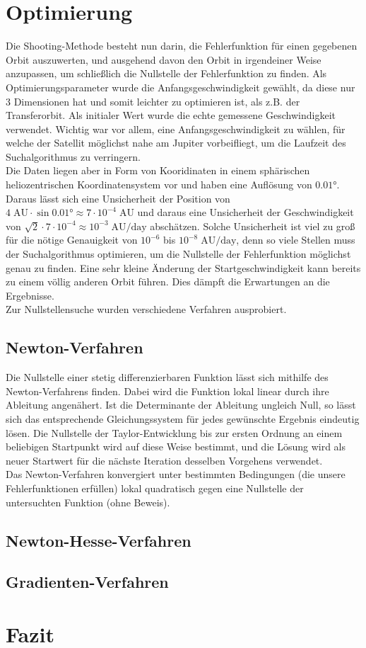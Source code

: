 \section{Optimierung}
Die Shooting-Methode besteht nun darin, die Fehlerfunktion für einen gegebenen Orbit auszuwerten, und ausgehend davon den Orbit in irgendeiner Weise anzupassen, um schließlich die Nullstelle der Fehlerfunktion zu finden.
Als Optimierungsparameter wurde die Anfangsgeschwindigkeit gewählt, da diese nur 3 Dimensionen hat und somit leichter zu optimieren ist, als z.B. der Transferorbit.
Als initialer Wert wurde die echte gemessene Geschwindigkeit verwendet. Wichtig war vor allem, eine Anfangsgeschwindigkeit zu wählen, für welche der Satellit möglichst nahe am Jupiter vorbeifliegt, um die Laufzeit des Suchalgorithmus zu verringern. \\
Die Daten liegen aber in Form von Kooridinaten in einem sphärischen heliozentrischen Koordinatensystem vor und haben eine Auflösung von $0.01\text{°}$.
Daraus lässt sich eine Unsicherheit der Position von $4\;\text{AU}\cdot\sin 0.01\text{°}\approx 7\cdot 10^{-4}\;\text{AU}$ und daraus eine Unsicherheit der Geschwindigkeit von $\sqrt{2}\cdot 7\cdot 10^{-4} \approx 10^{-3}\;\text{AU/day}$ abschätzen.
Solche Unsicherheit ist viel zu groß für die nötige Genauigkeit von $10^{-6}$ bis $10^{-8}\;\text{AU/day}$, denn so viele Stellen muss der Suchalgorithmus optimieren, um die Nullstelle der Fehlerfunktion möglichst genau zu finden. Eine sehr kleine Änderung der Startgeschwindigkeit kann bereits zu einem völlig anderen Orbit führen. Dies dämpft die Erwartungen an die Ergebnisse.\\
Zur Nullstellensuche wurden verschiedene Verfahren ausprobiert.

\subsection{Newton-Verfahren}

Die Nullstelle einer stetig differenzierbaren Funktion lässt sich mithilfe des Newton-Verfahrens finden. Dabei wird die Funktion lokal linear durch ihre Ableitung angenähert. Ist die Determinante der Ableitung ungleich Null, so lässt sich das entsprechende Gleichungssystem für jedes gewünschte Ergebnis eindeutig lösen. Die Nullstelle der Taylor-Entwicklung bis zur ersten Ordnung an einem beliebigen Startpunkt wird auf diese Weise bestimmt, und die Lösung wird als neuer Startwert für die nächste Iteration desselben Vorgehens verwendet. \\
Das Newton-Verfahren konvergiert unter bestimmten Bedingungen (die unsere Fehlerfunktionen erfüllen) lokal quadratisch gegen eine Nullstelle der untersuchten Funktion (ohne Beweis).

\subsection{Newton-Hesse-Verfahren}



\subsection{Gradienten-Verfahren}

\section{Fazit}




